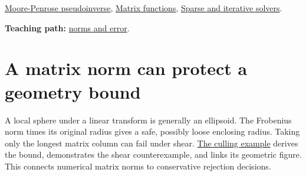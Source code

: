 \hyperref[appendix-541306fdbc1b]{Moore-Penrose pseudoinverse}, \hyperref[appendix-0f4bc2bf2b1f]{Matrix functions}, \hyperref[appendix-67c87a3d9e94]{Sparse and iterative solvers}.

\textbf{Teaching path:} \href{Continuous\%20Notes/Computing\%20Foundations\%20-\%20From\%20Bits\%20to\%20C++\%20and\%20Systems\%20APIs\#Matrix\%20norms\%20give\%20scale\%20to\%20residuals\%20and\%20error\%20claims}{norms and error}.

\section{A matrix norm can protect a geometry bound}\label{appendix-f8657bac66e5-a-matrix-norm-can-protect-a-geometry-bound}

A local sphere under a linear transform is generally an ellipsoid. The Frobenius norm times its original radius gives a safe, possibly loose enclosing radius. Taking only the longest matrix column can fail under shear. \href{Continuous\%20Notes/University\%20-\%20Worlds,\%20Images\%20and\%20Inference\%20-\%20Graphics,\%20Vision\%20and\%20Photography\#A\%20line\%20corridor\%20can\%20be\%20a\%20cheap\%20prefilter\%20for\%20shadow-caster\%20work}{The culling example} derives the bound, demonstrates the shear counterexample, and links its geometric figure. This connects numerical matrix norms to conservative rejection decisions.
